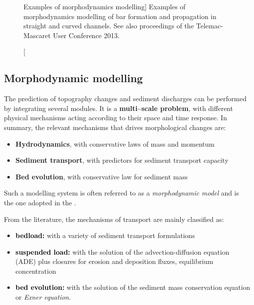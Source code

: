 \begin{figure}[H]%
\begin{center}
%
\hfil
%
%
\hfil
%

%
\hfil
\mbox{}
\end{center}
\caption
[Examples of morphodynamics modelling]
{Examples of morphodynamics modelling of bar formation and propagation in straight and curved channels. See also proceedings of the Telemac-Mascaret User Conference 2013.}
\label{fig:ExampleMultipleImages}
\end{figure}

\subsection{Morphodynamic modelling}
The prediction of topography changes and sediment discharges can be performed by integrating several modules. It is a {\bf multi--scale problem}, with different physical mechanisms acting according to their space and time response. In summary, the relevant mechanisms that drives morphological changes are:
\begin{itemize}
         \item {\bf Hydrodynamics}, with conservative laws of mass and momentum 
         \item {\bf Sediment transport}, with predictors for sediment transport capacity 
         \item {\bf Bed evolution}, with conservative law for sediment mass 
\end{itemize}
\noindent
Such a modelling system is often referred to as a \emph{morphodynamic model} and is the one adopted in the \telemacsystem{}.

\noindent
From the literature, the mechanisms of transport are mainly classified as:
\begin{itemize}
\item \textcolor{black}{\bf bedload:} with a variety of sediment transport formulations
\item \textcolor{black}{\bf suspended load:} with the solution of the advection-diffusion equation (ADE) plus closures for erosion and deposition fluxes, equilibrium concentration
\item \textcolor{black}{\bf bed evolution:} with the solution of the sediment mass conservation equation or \textit{Exner equation}.
\end{itemize}

